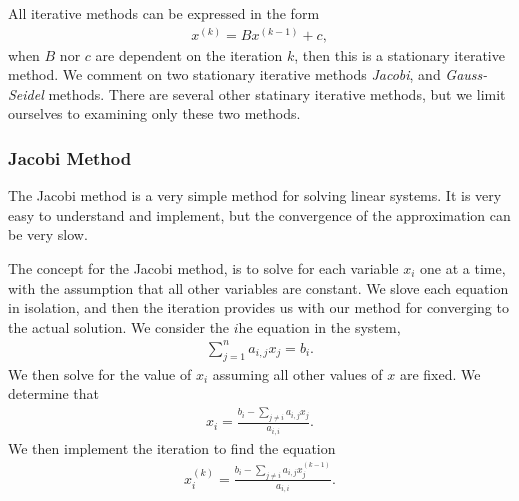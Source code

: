 \documentclass[../fem.tex]{subfiles}
\begin{document}
All iterative methods can be expressed in the form
\begin{align*}
  x^{(k)}=Bx^{(k-1)}+c,
\end{align*}
when $B$ nor $c$ are dependent on the iteration $k$, then this is a stationary
iterative method. We comment on two stationary iterative methods
\textit{Jacobi}, and \textit{Gauss-Seidel} methods. There are several other
statinary iterative methods, but we limit ourselves to examining only these two
methods.

\subsubsection{Jacobi Method}%
\label{ssub:jacobi_method}

The Jacobi method is a very simple method for solving linear systems. It is
very easy to understand and implement, but the convergence of the approximation
can be very slow.

\begin{Figure}
   \begin{center}
     
   \end{center}
   \label{fig:j_time}
\end{Figure}

The concept for the Jacobi method, is to solve for each variable $x_i$ one at a
time, with the assumption that all other variables are constant. We slove each
equation in isolation, and then the iteration provides us with our method for
converging to the actual solution. We consider the $i$he equation in the
system,
\begin{align*}
  \sum_{j=1}^na_{i,j}x_j=b_i.
\end{align*}
We then solve for the value of $x_i$ assuming all other values of $x$ are
fixed. We determine that
\begin{align*}
  x_i=\frac{b_i-\sum_{j\neq i}a_{i,j}x_j}{a_{i,i}}.
\end{align*}
We then implement the iteration to find the equation
\begin{align*}
  x_i^{(k)}=\frac{b_i-\sum_{j\neq i}a_{i,j}x_j^{(k-1)}}{a_{i,i}}.
\end{align*}

\begin{Figure}
   \begin{center}
     
   \end{center}
   \label{fig:j_err}
\end{Figure}
\end{document}
